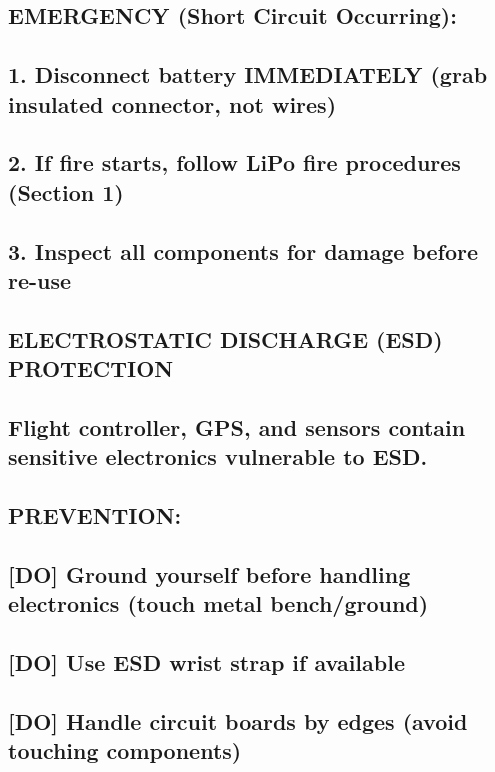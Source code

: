 \documentclass[11pt,letterpaper]{article}
\begin{document}
{{\subsection*{EMERGENCY (Short Circuit Occurring):}

\subsection*{1. Disconnect battery IMMEDIATELY (grab insulated connector, not wires)}

\subsection*{2. If fire starts, follow LiPo fire procedures (Section 1)}

\subsection*{3. Inspect all components for damage before re-use}

\subsection*{ELECTROSTATIC DISCHARGE (ESD) PROTECTION}

\subsection*{Flight controller, GPS, and sensors contain sensitive electronics vulnerable to ESD.}

\subsection*{PREVENTION:}

\subsection*{[DO] Ground yourself before handling electronics (touch metal bench/ground)}

\subsection*{[DO] Use ESD wrist strap if available}

\subsection*{[DO] Handle circuit boards by edges (avoid touching components)}

}}
\end{document}

